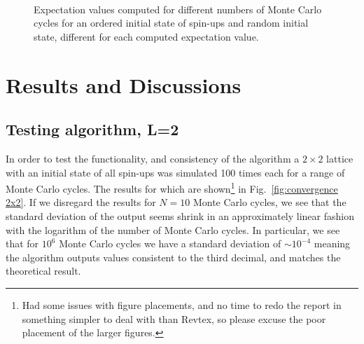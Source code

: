\documentclass[10pt,showpacs,preprintnumbers,amsmath,amssymb,nofootinbib,aps,prl,twocolumn,groupedaddress,superscriptaddress,showkeys]{revtex4-1}
\begin{document}
\begin{figure}[h!p]
{    }
    \\
    \caption{\label{fig:20x20 expecvals} Expectation values computed for different numbers of Monte Carlo cycles for an ordered initial state of spin-ups and random initial state, different for each computed expectation value.}
  \end{figure}
  \section{Results and Discussions}

  \subsection{Testing algorithm, L=2}

  In order to test the functionality, and consistency of the algorithm a $2\times2$ lattice with an initial state of all spin-ups was simulated 100 times each for a range of Monte Carlo cycles. The results for which are shown\footnote{Had some issues with figure placements, and no time to redo the report in something simpler to deal with than Revtex, so please excuse the poor placement of the larger figures.} in Fig.~\ref{fig:convergence 2x2}. If we disregard the results for $N=10$ Monte Carlo cycles, we see that the standard deviation of the output seems shrink in an approximately linear fashion with the logarithm of the number of Monte Carlo cycles. In particular, we see that for $10^6$ Monte Carlo cycles we have a standard deviation of $\sim10^{-4}$ meaning the algorithm outputs values consistent to the third decimal, and matches the theoretical result.
\end{document}
